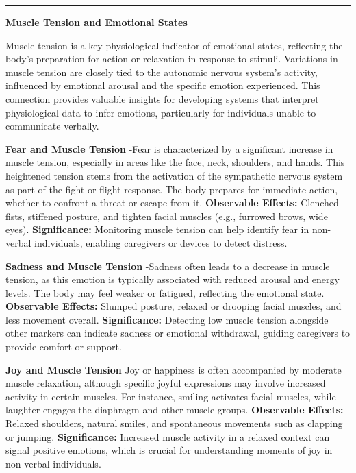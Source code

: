 \documentclass[12pt, research paper]{report}
\begin{document}
	\noindent \rule{13.85cm}{0.01cm}
	\newline \textbf{Muscle Tension and Emotional States}
	\bigskip
	
	\noindent Muscle tension is a key physiological indicator of emotional states, reflecting the body's preparation for action or relaxation in response to stimuli. Variations in muscle tension are closely tied to the autonomic nervous system's activity, influenced by emotional arousal and the specific emotion experienced. This connection provides valuable insights for developing systems that interpret physiological data to infer emotions, particularly for individuals unable to communicate verbally.
	
	\bigskip 
	\noindent \textbf{Fear and Muscle Tension}
	\newline -Fear is characterized by a significant increase in muscle tension, especially in areas like the face, neck, shoulders, and hands. This heightened tension stems from the activation of the sympathetic nervous system as part of the fight-or-flight response. The body prepares for immediate action, whether to confront a threat or escape from it.
	\newline \textbf{Observable Effects:} Clenched fists, stiffened posture, and tighten facial muscles (e.g., furrowed brows, wide eyes).
	\newline \textbf{Significance:} Monitoring muscle tension can help identify fear in non-verbal individuals, enabling caregivers or devices to detect distress.
	\bigskip 
	
	\noindent \textbf{Sadness and Muscle Tension}
	\newline -Sadness often leads to a decrease in muscle tension, as this emotion is typically associated with reduced arousal and energy levels. The body may feel weaker or fatigued, reflecting the emotional state.
	\newline \textbf{Observable Effects:} Slumped posture, relaxed or drooping facial muscles, and less movement overall.
	\newline \textbf{Significance:} Detecting low muscle tension alongside other markers can indicate sadness or emotional withdrawal, guiding caregivers to provide comfort or support.
	\bigskip

	\noindent \textbf{Joy and Muscle Tension}
	\newline Joy or happiness is often accompanied by moderate muscle relaxation, although specific joyful expressions may involve increased activity in certain muscles. For instance, smiling activates facial muscles, while laughter engages the diaphragm and other muscle groups.
	\newline \textbf{Observable Effects:} Relaxed shoulders, natural smiles, and spontaneous movements such as clapping or jumping.
	\newline \textbf{Significance:} Increased muscle activity in a relaxed context can signal positive emotions, which is crucial for understanding moments of joy in non-verbal individuals.
	\bigskip
	
\end{document}

